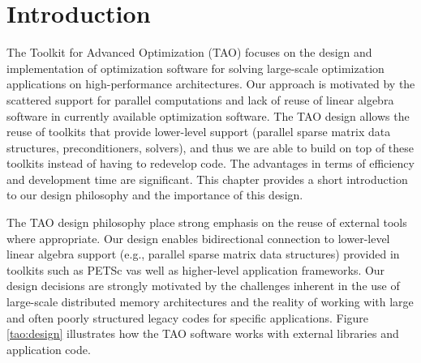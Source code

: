 \documentclass[]{book}
\begin{document}

%

%

\chapter{Introduction}
\label{chapter:introduction}


The Toolkit for Advanced Optimization (TAO) focuses on the design and
implementation of optimization software for 
solving large-scale optimization applications on high-performance
architectures.  Our approach is motivated by the scattered support for
parallel computations and lack of reuse of linear algebra software in
currently available optimization software.  The TAO design allows the
reuse of toolkits that provide lower-level support (parallel sparse
matrix data structures, preconditioners, solvers), and thus we are
able to build on top of these toolkits instead of having to redevelop
code. The advantages in terms of efficiency and development time are
significant.  This chapter provides a short introduction to our design 
philosophy and the importance of this design.



The TAO design philosophy place strong emphasis on the reuse of
external tools where appropriate.  Our design enables bidirectional
connection to lower-level linear algebra support (e.g., parallel sparse
matrix data structures) provided in toolkits such as PETSc
\cite{petsc-web-page,petsc,petsc-user-ref}
vas well as higher-level application
frameworks.  Our design decisions are strongly motivated by the
challenges inherent in the use of large-scale distributed memory
architectures and the reality of working with large and often poorly
structured legacy codes for specific applications.  Figure
\ref{tao:design} illustrates how the TAO software works with external
libraries and application code.
\end{document}
